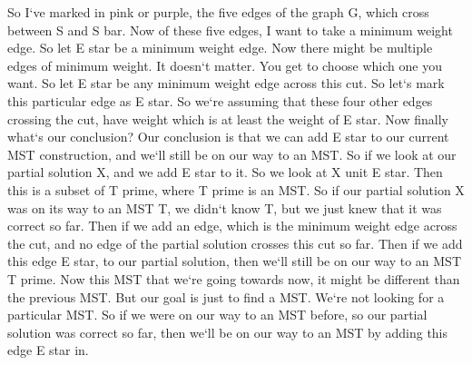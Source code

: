 So I`ve marked in pink or purple, the five edges of the graph G, which cross between S and S bar.
Now of these five edges, I want to take a minimum weight edge.
So let E star be a minimum weight edge.
Now there might be multiple edges of minimum weight.
It doesn`t matter.
You get to choose which one you want.
So let E star be any minimum weight edge across this cut.
So let`s mark this particular edge as E star.
So we`re assuming that these four other edges crossing the cut, have weight which is at least the weight of E star.
Now finally what`s our conclusion? Our conclusion is that we can add E star to our current MST construction, and we`ll still be on our way to an MST\@.
So if we look at our partial solution X, and we add E star to it.
So we look at X unit E star.
Then this is a subset of T prime, where T prime is an MST\@.
So if our partial solution X was on its way to an MST T, we didn`t know T, but we just knew that it was correct so far.
Then if we add an edge, which is the minimum weight edge across the cut, and no edge of the partial solution crosses this cut so far.
Then if we add this edge E star, to our partial solution, then we`ll still be on our way to an MST T prime.
Now this MST that we`re going towards now, it might be different than the previous MST\@.
But our goal is just to find a MST\@.
We`re not looking for a particular MST\@.
So if we were on our way to an MST before, so our partial solution was correct so far, then we`ll be on our way to an MST by adding this edge E star in.

